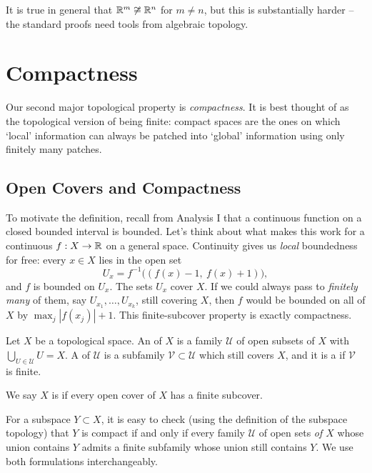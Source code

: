\documentclass[a4paper]{scrartcl}
\begin{document}
\begin{remark}
    It is true in general that $\mathbb{R}^m \not\cong \mathbb{R}^n$ for $m \neq n$, but this is substantially harder -- the standard proofs need tools from algebraic topology.
\end{remark}

\section{Compactness}

Our second major topological property is \emph{compactness}. It is best thought of as the topological version of being finite: compact spaces are the ones on which `local' information can always be patched into `global' information using only finitely many patches.

\subsection{Open Covers and Compactness}

To motivate the definition, recall from Analysis I that a continuous function on a closed bounded interval is bounded. Let's think about what makes this work for a continuous $f: X \rightarrow \mathbb{R}$ on a general space. Continuity gives us \emph{local} boundedness for free: every $x \in X$ lies in the open set
$$
U_x = f^{-1}\big((f(x) - 1,\ f(x) + 1)\big),
$$
and $f$ is bounded on $U_x$. The sets $U_x$ cover $X$. If we could always pass to \emph{finitely many} of them, say $U_{x_1}, \dots, U_{x_k}$, still covering $X$, then $f$ would be bounded on all of $X$ by $\max_j |f(x_j)| + 1$. This finite-subcover property is exactly compactness.

\begin{definition}
    Let $X$ be a topological space. An  of $X$ is a family $\mathcal{U}$ of open subsets of $X$ with $\bigcup_{U \in \mathcal{U}} U = X$. A  of $\mathcal{U}$ is a subfamily $\mathcal{V} \subset \mathcal{U}$ which still covers $X$, and it is a  if $\mathcal{V}$ is finite.

    We say $X$ is  if every open cover of $X$ has a finite subcover.
\end{definition}

For a subspace $Y \subset X$, it is easy to check (using the definition of the subspace topology) that $Y$ is compact if and only if every family $\mathcal{U}$ of open sets \emph{of $X$} whose union contains $Y$ admits a finite subfamily whose union still contains $Y$. We use both formulations interchangeably.
\end{document}
